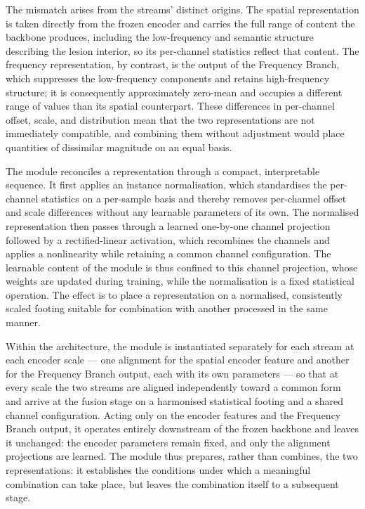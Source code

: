 The mismatch arises from the streams' distinct origins. The spatial representation is taken directly from the frozen encoder and carries the full range of content the backbone produces, including the low-frequency and semantic structure describing the lesion interior, so its per-channel statistics reflect that content. The frequency representation, by contrast, is the output of the Frequency Branch, which suppresses the low-frequency components and retains high-frequency structure; it is consequently approximately zero-mean and occupies a different range of values than its spatial counterpart. These differences in per-channel offset, scale, and distribution mean that the two representations are not immediately compatible, and combining them without adjustment would place quantities of dissimilar magnitude on an equal basis.

The module reconciles a representation through a compact, interpretable sequence. It first applies an instance normalisation, which standardises the per-channel statistics on a per-sample basis and thereby removes per-channel offset and scale differences without any learnable parameters of its own. The normalised representation then passes through a learned one-by-one channel projection followed by a rectified-linear activation, which recombines the channels and applies a nonlinearity while retaining a common channel configuration. The learnable content of the module is thus confined to this channel projection, whose weights are updated during training, while the normalisation is a fixed statistical operation. The effect is to place a representation on a normalised, consistently scaled footing suitable for combination with another processed in the same manner.

Within the architecture, the module is instantiated separately for each stream at each encoder scale --- one alignment for the spatial encoder feature and another for the Frequency Branch output, each with its own parameters --- so that at every scale the two streams are aligned independently toward a common form and arrive at the fusion stage on a harmonised statistical footing and a shared channel configuration. Acting only on the encoder features and the Frequency Branch output, it operates entirely downstream of the frozen backbone and leaves it unchanged: the encoder parameters remain fixed, and only the alignment projections are learned. The module thus prepares, rather than combines, the two representations: it establishes the conditions under which a meaningful combination can take place, but leaves the combination itself to a subsequent stage.

